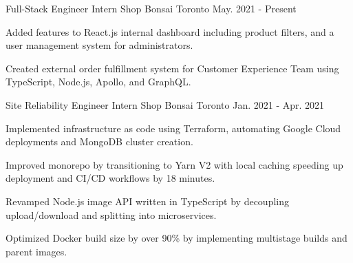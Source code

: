 

\begin{cventries}

  \cventry
    {Full-Stack Engineer Intern} %
    {Shop Bonsai} %
    {Toronto} %
    {May. 2021 - Present} %
    {
      \begin{cvitems} %
        \item {Added features to React.js internal dashboard including product filters, and a user management system for administrators.}
        \item {Created external order fulfillment system for Customer Experience Team using TypeScript, Node.js, Apollo, and GraphQL.}
      \end{cvitems}
    }
    
  \cventry
    {Site Reliability Engineer Intern} %
    {Shop Bonsai} %
    {Toronto} %
    {Jan. 2021 - Apr. 2021} %
    {
      \begin{cvitems} %
        \item {Implemented infrastructure as code using Terraform, automating Google Cloud deployments and MongoDB cluster creation.}
        \item {Improved monorepo by transitioning to Yarn V2 with local caching speeding up deployment and CI/CD workflows by 18 minutes.}
        \item {Revamped Node.js image API written in TypeScript by decoupling upload/download and splitting into microservices.}
        \item {Optimized Docker build size by over 90\% by implementing multistage builds and parent images.}
      \end{cvitems}
    }
    
\end{cventries}
